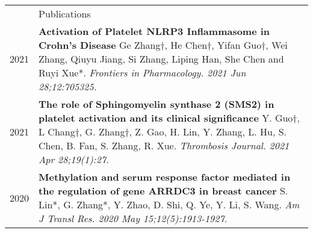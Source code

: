 \documentclass[letterpaper, 11pt]{article}
\newcommand{\headingfont}{\Large\color{OliveGreen}}
\newenvironment{SectionTable}[1]{
	\renewcommand*{\arraystretch}{1.7}
	\setlength{\tabcolsep}{10pt}
	\begin{longtable}{Rp{5.2in}} & #1 \\}
{\end{longtable}\vspace{-.3cm}}
\begin{document}

\begin{SectionTable}{\headingfont Publications} 
2021 & 
\textbf{Activation of Platelet NLRP3 Inflammasome in Crohn’s Disease} \newline
Ge Zhang†, He Chen†, Yifan Guo†, Wei Zhang, Qiuyu Jiang, Si Zhang, Liping Han, She Chen and Ruyi Xue*. \newline
\textit{Frontiers in Pharmacology. 2021 Jun 28;12:705325.} \\

2021 & 
\textbf{The role of Sphingomyelin synthase 2 (SMS2) in platelet activation and its clinical significance} \newline
Y. Guo†, L Chang†, G. Zhang†, Z. Gao, H. Lin, Y. Zhang, L. Hu, S. Chen, B. Fan, S. Zhang, R. Xue. \newline
\textit{Thrombosis Journal. 2021 Apr 28;19(1):27.} \\

2020 & 
\textbf{Methylation and serum response factor mediated in the regulation of gene ARRDC3 in breast cancer} \newline
S. Lin*, G. Zhang*, Y. Zhao, D. Shi, Q. Ye, Y. Li, S. Wang. \newline
\textit{Am J Transl Res. 2020 May 15;12(5):1913-1927.}

\end{SectionTable}

\end{document}
